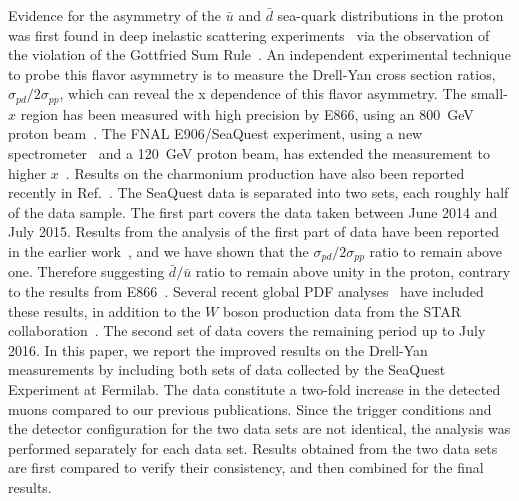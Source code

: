 \documentclass[reprint,aps,unsortedaddress,superscriptaddress,prl,floatfix,showpacs,linenumbers,final]{revtex4-2}
\begin{document}
Evidence for the asymmetry of the $\bar{u}$ and $\bar{d}$ sea-quark distributions in the proton was first found in
deep inelastic scattering experiments~\cite{stein1975,amaudruz1991} via the observation of the violation
of the Gottfried Sum Rule~\cite{gottfried1967}.
An independent experimental technique to probe this flavor asymmetry is to measure the Drell-Yan cross section ratios,
$\sigma_{pd}/2\sigma_{pp}$, which can reveal the x dependence of this flavor asymmetry.
The small-$x$ region has been measured with high precision by E866,
using an \SI{800}{\GeV} proton beam~\cite{towell2001}.
The FNAL E906/SeaQuest experiment, using a new spectrometer~\cite{aidala2019} and a \SI{120}{\GeV}
proton beam, has extended the measurement to higher $x$~\cite{dove2021,dove2023}.
Results on the charmonium production have also been reported recently in Ref.~\cite{leung2024a}.
The SeaQuest data is separated into two sets, each roughly half of the data sample.
The first part covers the data taken between June 2014 and July 2015.
Results from the analysis of the first part of data have been reported in the earlier work~\cite{dove2021,dove2023},
and we have shown that the $\sigma_{pd}/2\sigma_{pp}$ ratio to remain above one.
Therefore suggesting $\bar{d}/\bar{u}$ ratio to remain above unity in the proton,
contrary to the results from E866~\cite{towell2001}.
Several recent global PDF analyses~\cite{cocuzza2021,ball2022a,accardi2023,alekhin2023}
have included these results, in addition to the $W$ boson production data from the STAR collaboration~\cite{adam2021}.
The second set of data covers the remaining period up to July 2016.
In this paper, we report the improved results on the Drell-Yan measurements
by including both sets of data collected by the SeaQuest Experiment at Fermilab.
The data constitute a two-fold increase in the detected muons compared to our previous publications.
Since the trigger
conditions and the detector configuration for the two data sets are not
identical, the analysis was performed separately for each data set.
Results obtained from the two data sets are first compared to verify their
consistency, and then combined for the final results.
\end{document}
